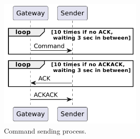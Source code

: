 \begin{figure}[ht]
    \centering
    \includegraphics[width=200pt]{uml/command_ack.pdf}
    \caption{Command sending process.}
    \label{img: command ack}
\end{figure}


